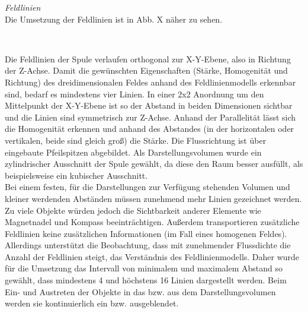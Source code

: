 \textit{Feldlinien}\\
Die Umsetzung der Feldlinien ist in Abb. X näher zu sehen.
\vspace{4px}
\begin{center}
	\\
\end{center}
\vspace{6px}
Die Feldlinien der Spule verlaufen orthogonal zur X-Y-Ebene, also in Richtung der Z-Achse. Damit die gewünschten Eigenschaften (Stärke, Homogenität und Richtung) des dreidimensionalen Feldes anhand des Feldlinienmodells erkennbar sind, bedarf es mindestens vier Linien. In einer 2x2 Anordnung um den Mittelpunkt der X-Y-Ebene ist so der Abstand in beiden Dimensionen sichtbar und die Linien sind symmetrisch zur Z-Achse. Anhand der Parallelität lässt sich die Homogenität erkennen und anhand des Abstandes (in der horizontalen oder vertikalen, beide sind gleich groß) die Stärke. Die Flussrichtung ist über eingebaute Pfeilspitzen abgebildet. Als Darstellungsvolumen wurde ein zylindrischer Ausschnitt der Spule gewählt, da diese den Raum besser ausfüllt, als beispielsweise ein kubischer Ausschnitt.\\

Bei einem festen, für die Darstellungen zur Verfügung stehenden Volumen und kleiner werdenden Abständen müssen zunehmend mehr Linien gezeichnet werden. Zu viele Objekte würden jedoch die Sichtbarkeit anderer Elemente wie Magnetnadel und Kompass beeinträchtigen. Außerdem transportieren zusätzliche Feldlinien keine zusätzlichen Informationen (im Fall eines homogenen Feldes). Allerdings unterstützt die Beobachtung, dass mit zunehmender Flussdichte die Anzahl der Feldlinien steigt, das Verständnis des Feldlinienmodells. Daher wurde für die Umsetzung das Intervall von minimalem und maximalem Abstand so gewählt, dass mindestens 4 und höchstens 16 Linien dargestellt werden. Beim Ein- und Austreten der Objekte in das bzw. aus dem Darstellungsvolumen werden sie kontinuierlich ein bzw. ausgeblendet.\\

